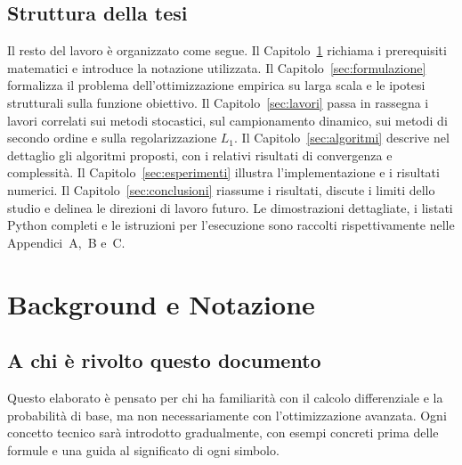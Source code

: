 \documentclass[a4paper,12pt]{article}
\numberwithin{equation}{section}
\numberwithin{figure}{section}
\numberwithin{table}{section}
\begin{document}
\subsection{Struttura della tesi}

Il resto del lavoro è organizzato come segue. Il Capitolo~\ref{sec:background}
richiama i prerequisiti matematici e introduce la notazione utilizzata.
Il Capitolo~\ref{sec:formulazione} formalizza il problema dell'ottimizzazione
empirica su larga scala e le ipotesi strutturali sulla funzione obiettivo.
Il Capitolo~\ref{sec:lavori} passa in rassegna i lavori correlati sui metodi
stocastici, sul campionamento dinamico, sui metodi di secondo ordine e sulla
regolarizzazione $L_1$. Il Capitolo~\ref{sec:algoritmi} descrive nel dettaglio
gli algoritmi proposti, con i relativi risultati di convergenza e complessità.
Il Capitolo~\ref{sec:esperimenti} illustra l'implementazione e i risultati
numerici. Il Capitolo~\ref{sec:conclusioni} riassume i risultati, discute i
limiti dello studio e delinea le direzioni di lavoro futuro. Le dimostrazioni
dettagliate, i listati Python completi e le istruzioni per l'esecuzione sono
raccolti rispettivamente nelle Appendici~A,~B e~C.


\section{Background e Notazione}\label{sec:background}

\subsection{A chi \`e rivolto questo documento}

Questo elaborato \`e pensato per chi ha familiarit\`a con il calcolo differenziale e la probabilit\`a di base, ma non necessariamente con l'ottimizzazione avanzata. Ogni concetto tecnico sar\`a introdotto gradualmente, con esempi concreti prima delle formule e una guida al significato di ogni simbolo.
\end{document}
